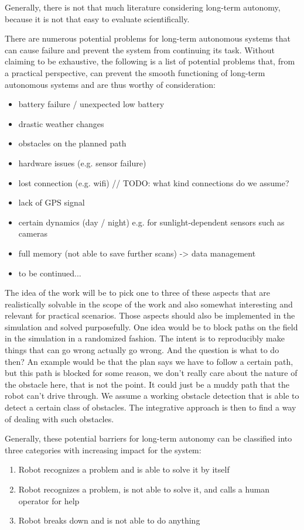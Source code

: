 \documentclass[german, master, expose, latin1]{base/thesis_KBS}
\begin{document}
Generally, there is not that much literature considering long-term autonomy, because it is not that easy to evaluate scientifically.\newline

\pagebreak

There are numerous potential problems for long-term autonomous systems that can cause failure and prevent the system from continuing its task.
Without claiming to be exhaustive, the following is a list of potential problems that, from a practical perspective, can prevent the smooth functioning
of long-term autonomous systems and are thus worthy of consideration:
\begin{itemize}
    \item battery failure / unexpected low battery
    \item drastic weather changes
    \item obstacles on the planned path
    \item hardware issues (e.g. sensor failure)
    \item lost connection (e.g. wifi) // TODO: what kind connections do we assume?
    \item lack of GPS signal
    \item certain dynamics (day / night) e.g. for sunlight-dependent sensors such as cameras
    \item full memory (not able to save further scans) -> data management
    \item to be continued...
\end{itemize}

The idea of the work will be to pick one to three of these aspects that are realistically solvable in the scope of the work and also somewhat interesting and 
relevant for practical scenarios. Those aspects should also be implemented in the simulation and solved purposefully.
One idea would be to block paths on the field in the simulation in a randomized fashion. The intent is to reproducibly make things that can go wrong actually go wrong.
And the question is what to do then? An example would be that the plan says we have to follow a certain path, but this path is blocked for some reason, we don't really
care about the nature of the obstacle here, that is not the point. It could just be a muddy path that the robot can't drive through. We assume a working obstacle detection
that is able to detect a certain class of obstacles. The integrative approach is then to find a way of dealing with such obstacles.

Generally, these potential barriers for long-term autonomy can be classified into three categories with increasing impact for the system:
\begin{enumerate}
    \item Robot recognizes a problem and is able to solve it by itself
    \item Robot recognizes a problem, is not able to solve it, and calls a human operator for help
    \item Robot breaks down and is not able to do anything
\end{enumerate}
\end{document}
